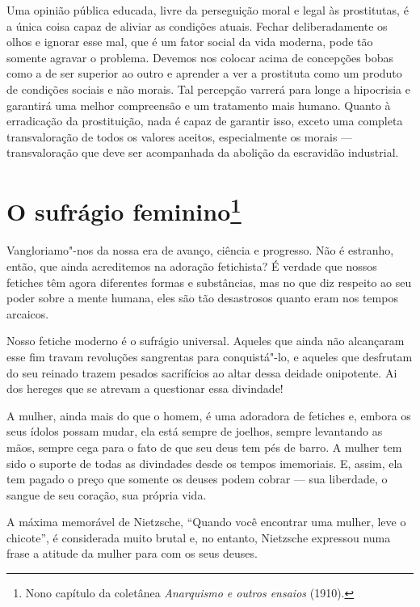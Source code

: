 Uma opinião pública educada, livre da perseguição moral e legal às
prostitutas, é a única coisa capaz de aliviar as condições atuais.
Fechar deliberadamente os olhos e ignorar esse mal, que é um fator
social da vida moderna, pode tão somente agravar o problema. Devemos nos
colocar acima de concepções bobas como a de ser superior ao outro e
aprender a ver a prostituta como um produto de condições sociais e não
morais. Tal percepção varrerá para longe a hipocrisia e garantirá uma
melhor compreensão e um tratamento mais humano. Quanto à erradicação da
prostituição, nada é capaz de garantir isso, exceto uma completa
transvaloração de todos os valores aceitos, especialmente os morais --- transvaloração que deve ser acompanhada da abolição da escravidão
industrial.

\chapter{O sufrágio feminino\footnote{Nono capítulo da coletânea \emph{Anarquismo
  e outros ensaios} (1910).}}

Vangloriamo"-nos da nossa era de avanço, ciência e progresso. Não é
estranho, então, que ainda acreditemos na adoração fetichista? É verdade
que nossos fetiches têm agora diferentes formas e substâncias, mas no
que diz respeito ao seu poder sobre a mente humana, eles são tão
desastrosos quanto eram nos tempos arcaicos.

Nosso fetiche moderno é o sufrágio universal. Aqueles que ainda não
alcançaram esse fim travam revoluções sangrentas para conquistá"-lo, e
aqueles que desfrutam do seu reinado trazem pesados ​​sacrifícios ao
altar dessa deidade onipotente. Ai dos hereges que se atrevam a
questionar essa divindade!

A mulher, ainda mais do que o homem, é uma adoradora de fetiches e,
embora os seus ídolos possam mudar, ela está sempre de joelhos, sempre
levantando as mãos, sempre cega para o fato de que seu deus tem pés de
barro. A mulher tem sido o suporte de todas as divindades desde os tempos
imemoriais. E, assim, ela tem pagado o preço que somente os deuses podem
cobrar --- sua liberdade, o sangue de seu coração, sua própria vida.

A máxima memorável de Nietzsche, ``Quando você encontrar uma mulher,
leve o chicote'', é considerada muito brutal e, no entanto, Nietzsche
expressou numa frase a atitude da mulher para com os seus deuses.

